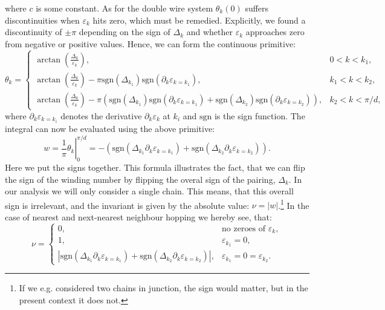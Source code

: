 where $c$ is some constant. As for the double wire system $\theta_k(0)$ suffers discontinuities when $\varepsilon_k$ hits zero, which must be remedied. Explicitly, we found a discontinuity of $\pm \pi$ depending on the sign of $\Delta_k$ and whether $\varepsilon_k$ approaches zero from negative or positive values. Hence, we can form the continuous primitive:
\begin{equation}
\theta_k = \left\{ \begin{matrix} 
\arctan\left(\frac{\Delta_k}{\varepsilon_k}\right), & 0 < k < k_1, \\
\arctan\left(\frac{\Delta_k}{\varepsilon_k}\right) - \pi\text{sgn}(\Delta_{k_1})\text{sgn}\left(\partial_k\varepsilon_{k = k_1}\right), & k_1 < k < k_2, \\
\arctan\left(\frac{\Delta_k}{\varepsilon_k}\right) - \pi\left(\text{sgn}(\Delta_{k_1})\text{sgn}\left(\partial_k\varepsilon_{k = k_1}\right) + \text{sgn}(\Delta_{k_2})\text{sgn}\left(\partial_k\varepsilon_{k = k_2}\right)\right), & k_2 < k < \pi / d,
  \end{matrix} \right. \nonumber 
\end{equation}
where $\partial_k\varepsilon_{k = k_i}$ denotes the derivative $\partial_k\varepsilon_k$ at $k_i$ and $\text{sgn}$ is the sign function. The integral can now be evaluated using the above primitive:
\begin{equation}
w = \left.\frac{1}{\pi}\theta_k\right|^{\pi / d}_{0} = -\left( \text{sgn}\left(\Delta_{k_1}\partial_k\varepsilon_{k = k_1}\right) + \text{sgn}\left(\Delta_{k_2}\partial_k\varepsilon_{k = k_2}\right) \right). \nonumber
\end{equation}
Here we put the signs together. This formula illustrates the fact, that we can flip the sign of the winding number by flipping the overal sign of the pairing, $\Delta_k$. In our analysis we will only consider a single chain. This means, that this overall sign is irrelevant, and the invariant is given by the absolute value: $\nu = |w|$.\footnote{If we e.g. considered two chains in junction, the sign would matter, but in the present context it does not.} In the case of nearest and next-nearest neighbour hopping we hereby see, that:
\begin{equation}
\nu = \left\{ \begin{matrix} 	0, 								& \text{no zeroes of } \varepsilon_k, \\
								1, 								& \varepsilon_{k_1} = 0, \\
								\left|\text{sgn}(\Delta_{k_1}\partial_k\varepsilon_{k = k_1}) + \text{sgn}(\Delta_{k_2}\partial_k\varepsilon_{k = k_2})\right|,   & \varepsilon_{k_1} = 0 = \varepsilon_{k_2}.
\end{matrix} \right. \nonumber
\end{equation}
